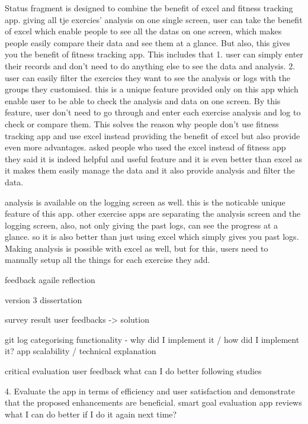 Status fragment is designed to combine the benefit of excel and fitness tracking app.
giving all tje exercies' analysis on one single screen, user can take the benefit of excel which enable people to see all the datas on one screen,
which makes people easily compare their data and see them at a glance.
But also, this gives you the benefit of fitness tracking app.
This includes that
1. user can simply enter their records and don't need to do anything else to see the data and analysis.
2. user can easily filter the exercies they want to see the analysis or logs with the groups they customised.
this is a unique feature provided only on this app which enable user to be able to check the analysis and data on one screen.
By this feature, user don't need to go through and enter each exercise analysis and log to check or compare them.
This solves the reason why people don't use fitness tracking app and use excel instead providing the benefit of excel but also provide even more advantages.
asked people who used the excel instead of fitness app
they said it is indeed helpful and useful feature
and it is even better than excel
as it makes them easily manage the data and it also provide analysis and filter the data.

analysis is available on the logging screen as well.
this is the noticable unique feature of this app. 
other exercise apps are separating the analysis screen and the logging screen, 
also, not only giving the past logs, can see the progress at a glance. 
so it is also better than just using excel which simply gives you past logs.
Making analysis is possible with excel as well, but for this, users need to manually setup all the things for each exercise they add.

feedback agaile reflection


version 3 dissertation

survey result
user feedbacks -> solution


git log categorising
functionality - why did I implement it / how did I implement it?
app scalability / technical explanation



critical evaluation
user feedback
what can I do better
following studies

4. Evaluate the app in terms of efficiency and user satisfaction and demonstrate that the proposed enhancements are beneficial.
	smart goal evaluation
	app reviews
	what I can do better if I do it again next time?
